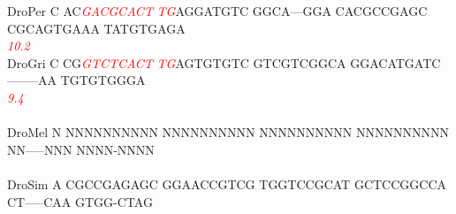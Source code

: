 \documentclass[11pt,twoside,reqno,a4paper]{article}
\begin{document}
{DroPer	C	AC\textit{\textcolor{Red}{G}}\textit{\textcolor{Red}{A}}\textit{\textcolor{Red}{C}}\textit{\textcolor{Red}{G}}\textit{\textcolor{Red}{C}}\textit{\textcolor{Red}{A}}\textit{\textcolor{Red}{C}}\textit{\textcolor{Red}{T}}	\textit{\textcolor{Red}{T}}\textit{\textcolor{Red}{G}}AGGATGTC	GGCA---GGA	CACGCCGAGC	CGCAGTGAAA	TATGTGAGA\\
\hspace*{7\charwidth}\hspace*{1\charwidth}\hspace*{3\charwidth}\textit{\textcolor{Red}{10.2}}\hspace*{1\charwidth}\hspace*{1\charwidth}\hspace*{1\charwidth}\hspace*{1\charwidth}\hspace*{1\charwidth}\\
DroGri	C	CG\textit{\textcolor{Red}{G}}\textit{\textcolor{Red}{T}}\textit{\textcolor{Red}{C}}\textit{\textcolor{Red}{T}}\textit{\textcolor{Red}{C}}\textit{\textcolor{Red}{A}}\textit{\textcolor{Red}{C}}\textit{\textcolor{Red}{T}}	\textit{\textcolor{Red}{T}}\textit{\textcolor{Red}{G}}AGTGTGTC	GTCGTCGGCA	GGACATGATC	--------AA	TGTGTGGGA\\
\hspace*{7\charwidth}\hspace*{1\charwidth}\hspace*{3\charwidth}\textit{\textcolor{Red}{9.4}}\hspace*{1\charwidth}\hspace*{1\charwidth}\hspace*{1\charwidth}\hspace*{1\charwidth}\hspace*{1\charwidth}\\
\\
DroMel	N	NNNNNNNNNN	NNNNNNNNNN	NNNNNNNNNN	NNNNNNNNNN	NN-----NNN	NNNN-NNNN\\
\hspace*{7\charwidth}\hspace*{1\charwidth}\hspace*{1\charwidth}\hspace*{1\charwidth}\hspace*{1\charwidth}\hspace*{1\charwidth}\hspace*{1\charwidth}\\
DroSim	A	CGCCGAGAGC	GGAACCGTCG	TGGTCCGCAT	GCTCCGGCCA	CT-----CAA	GTGG-CTAG\\
}
\end{document}

